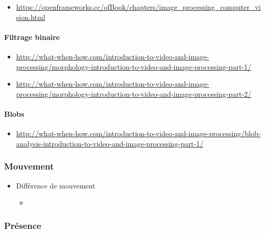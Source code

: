 \documentclass[
  french,
]{book}
\providecommand{\tightlist}{%
  \setlength{\itemsep}{0pt}\setlength{\parskip}{0pt}}
\begin{document}
\begin{itemize}
\tightlist
\item
  \url{https://openframeworks.cc/ofBook/chapters/image_processing_computer_vision.html}
\end{itemize}

\hypertarget{filtrage-binaire}{%
\paragraph{Filtrage binaire}\label{filtrage-binaire}}

\begin{itemize}
\tightlist
\item
  \url{http://what-when-how.com/introduction-to-video-and-image-processing/morphology-introduction-to-video-and-image-processing-part-1/}
\item
  \url{http://what-when-how.com/introduction-to-video-and-image-processing/morphology-introduction-to-video-and-image-processing-part-2/}
\end{itemize}

\hypertarget{blobs}{%
\paragraph{Blobs}\label{blobs}}

\begin{itemize}
\tightlist
\item
  \url{http://what-when-how.com/introduction-to-video-and-image-processing/blob-analysis-introduction-to-video-and-image-processing-part-1/}
\end{itemize}

\hypertarget{interagir_mouvement}{%
\subsubsection{Mouvement}\label{interagir_mouvement}}

\begin{itemize}
\tightlist
\item
  Différence de mouvement

  \begin{itemize}
  \tightlist
  \item
  \end{itemize}
\end{itemize}

\hypertarget{interagir_presence}{%
\subsubsection{Présence}\label{interagir_presence}}
\end{document}
